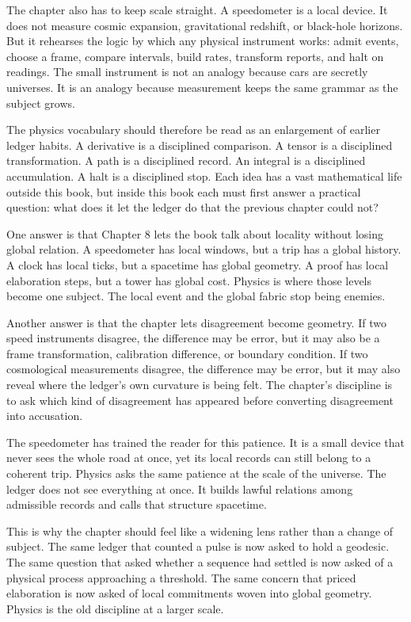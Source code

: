 The chapter also has to keep scale straight. A speedometer is a local device.
It does not measure cosmic expansion, gravitational redshift, or black-hole
horizons. But it rehearses the logic by which any physical instrument works:
admit events, choose a frame, compare intervals, build rates, transform
reports, and halt on readings. The small instrument is not an analogy because
cars are secretly universes. It is an analogy because measurement keeps the
same grammar as the subject grows.

The physics vocabulary should therefore be read as an enlargement of earlier
ledger habits. A derivative is a disciplined comparison. A tensor is a
disciplined transformation. A path is a disciplined record. An integral is a
disciplined accumulation. A halt is a disciplined stop. Each idea has a vast
mathematical life outside this book, but inside this book each must first
answer a practical question: what does it let the ledger do that the previous
chapter could not?

One answer is that Chapter 8 lets the book talk about locality without losing
global relation. A speedometer has local windows, but a trip has a global
history. A clock has local ticks, but a spacetime has global geometry. A proof
has local elaboration steps, but a tower has global cost. Physics is where
those levels become one subject. The local event and the global fabric stop
being enemies.

Another answer is that the chapter lets disagreement become geometry. If two
speed instruments disagree, the difference may be error, but it may also be a
frame transformation, calibration difference, or boundary condition. If two
cosmological measurements disagree, the difference may be error, but it may
also reveal where the ledger's own curvature is being felt. The chapter's
discipline is to ask which kind of disagreement has appeared before converting
disagreement into accusation.

The speedometer has trained the reader for this patience. It is a small device
that never sees the whole road at once, yet its local records can still belong
to a coherent trip. Physics asks the same patience at the scale of the
universe. The ledger does not see everything at once. It builds lawful
relations among admissible records and calls that structure spacetime.

This is why the chapter should feel like a widening lens rather than a change
of subject. The same ledger that counted a pulse is now asked to hold a
geodesic. The same question that asked whether a sequence had settled is now
asked of a physical process approaching a threshold. The same concern that
priced elaboration is now asked of local commitments woven into global
geometry. Physics is the old discipline at a larger scale.

